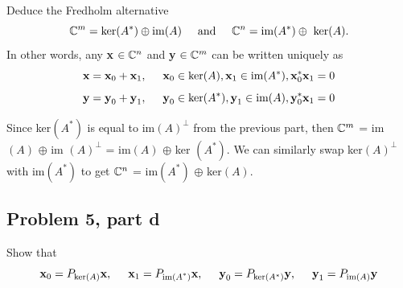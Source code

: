 Deduce the Fredholm alternative
\[ 
\mathbb{C}^m = \text{ker}(A^*) \oplus \text{im}(A) \hspace{5mm} \text{and} \hspace{5mm} \mathbb{C}^n = \text{im}(A^*) \oplus \text{ ker}(A).
\]
In other words, any \textbf{x} $\in \mathbb{C}^n$ and \textbf{y} $\in \mathbb{C}^m$ can be written uniquely as 
\[
\textbf{x} = \textbf{x}_0 + \textbf{x}_1, \hspace{5mm} \textbf{x}_0 \in \ker (A), \textbf{x}_1 \in \text{im} (A^*), \textbf{x}_0^*\textbf{x}_1 = 0
\]
 \[
\textbf{y} = \textbf{y}_0 + \textbf{y}_1, \hspace{5mm} \textbf{y}_0 \in \ker (A^*), \textbf{y}_1 \in \text{im} (A), \textbf{y}_0^*\textbf{x}_1 = 0
\]
\partbreak
\begin{solution}
    
Since ker$(A^*)$ is equal to im$(A)^\perp$ from the previous part, then $\mathbb{C}^m$ = im$(A)$ $\oplus$ im $(A)^\perp$ = im$(A)$ $\oplus$ ker $(A^*)$. We can similarly swap ker$(A)^\perp$ with im$(A^*)$ to get $\mathbb{C}^n$ = im$(A^*)$ $\oplus$ ker$(A)$.

\end{solution}


\subsection{Problem 5, part d}

Show that 
\[
\textbf{x}_0 = P_{\ker(A)}\textbf{x}, \hspace{5mm} \textbf{x}_1 = P_{\text{im$(A^*)$}}\textbf{x}, \hspace{5mm} \textbf{y}_0 = P_{\ker (A^*)}\textbf{y}, \hspace{5mm} \textbf{y}_1 = P_{\text{im}(A)}\textbf{y}
\]

\partbreak

